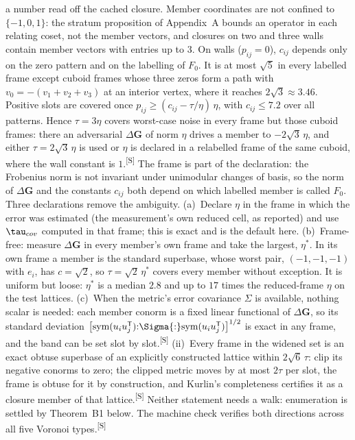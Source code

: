 \documentclass[preprint,pdf]{iucr}          %
\makeatletter
\newcommand{\Gmet}{\mathbf{G}}
\newcommand{\chk}[1]{\textsuperscript{[S\@nameuse{zn@#1}]}}
\makeatother
\begin{document}
a number read off the cached closure. Member coordinates are not confined to $\{-1,0,1\}$: the stratum proposition of Appendix~A bounds an operator in each relating coset, not the member vectors, and closures on two and three walls contain member vectors with entries up to $3$. On walls ($p_{ij}=0$), $c_{ij}$ depends only on the zero pattern and on the labelling of $F_0$. It is at most $\sqrt5$ in every labelled frame except cuboid frames whose three zeros form a path with $v_0=-(v_1+v_2+v_3)$ at an interior vertex, where it reaches $2\sqrt3\approx3.46$. Positive slots are covered once $p_{ij}\ge(c_{ij}-\tau/\eta)\,\eta$, with $c_{ij}\le7.2$ over all patterns. Hence $\tau=3\eta$ covers worst-case noise in every frame but those cuboid frames: there an adversarial $\Delta\Gmet$ of norm $\eta$ drives a member to $-2\sqrt3\,\eta$, and either $\tau=2\sqrt3\,\eta$ is used or $\eta$ is declared in a relabelled frame of the same cuboid, where the wall constant is $1$.\chk{z:overlap} The frame is part of the declaration: the Frobenius norm is not invariant under unimodular changes of basis, so the norm of $\Delta\Gmet$ and the constants $c_{ij}$ both depend on which labelled member is called $F_0$. Three declarations remove the ambiguity. (a)~Declare $\eta$ in the frame in which the error was estimated (the measurement's own reduced cell, as reported) and use $\tau_{\rm cov}$ computed in that frame; this is exact and is the default here. (b)~Frame-free: measure $\Delta\Gmet$ in every member's own frame and take the largest, $\eta^*$. In its own frame a member is the standard superbase, whose worst pair, $(-1,-1,-1)$ with $e_i$, has $c=\sqrt2$, so $\tau=\sqrt2\,\eta^*$ covers every member without exception. It is uniform but loose: $\eta^*$ is a median $2.8$ and up to $17$ times the reduced-frame $\eta$ on the test lattices. (c)~When the metric's error covariance $\Sigma$ is available, nothing scalar is needed: each member conorm is a fixed linear functional of $\Delta\Gmet$, so its standard deviation $\bigl[\mathrm{sym}(u_iu_j^{\sf T}){:}\Sigma{:}\mathrm{sym}(u_iu_j^{\sf T})\bigr]^{1/2}$ is exact in any frame, and the band can be set slot by slot.\chk{z:overlap} (ii)~Every frame in the widened set is an exact obtuse superbase of an explicitly constructed lattice within $2\sqrt6\,\tau$: clip its negative conorms to zero; the clipped metric moves by at most $2\tau$ per slot, the frame is obtuse for it by construction, and Kurlin's completeness certifies it as a closure member of that lattice.\chk{z:overlap} Neither statement needs a walk: enumeration is settled by Theorem~B1 below. The machine check verifies both directions across all five Voronoi types.\chk{z:overlap}
\end{document}
